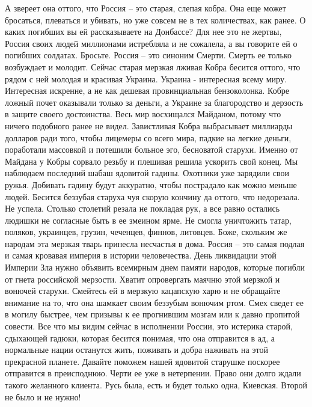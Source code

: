  
 
 
 
 

А звереет она оттого, что Россия – это старая, слепая кобра. Она еще может бросаться, плеваться и убивать, но уже совсем не в тех количествах, как ранее.
О каких погибших вы ей рассказываете на Донбассе? Для нее это не жертвы, Россия своих людей миллионами истребляла и не сожалела, а вы говорите ей о погибших солдатах. Бросьте. Россия – это синоним Смерти. Смерть ее только возбуждает и молодит.
Сейчас старая мерзкая лживая Кобра бесится оттого, что рядом с ней молодая и красивая Украина. Украина - интересная всему миру. Интересная искренне, а не как дешевая провинциальная бензоколонка. Кобре ложный почет оказывали только за деньги, а Украине за благородство и дерзость в защите своего достоинства. Весь мир восхищался Майданом, потому что ничего подобного ранее не видел. Завистливая Кобра выбрасывает миллиарды долларов ради того, чтобы лицемеры со всего мира, падкие на легкие деньги, поработали массовкой и потешили больное эго, бесноватой старухи.
Именно от Майдана у Кобры сорвало резьбу и плешивая решила ускорить свой конец. Мы наблюдаем последний шабаш ядовитой гадины. Охотники уже зарядили свои ружья. Добивать гадину будут аккуратно, чтобы пострадало как можно меньше людей.
Бесится беззубая старуха чуя скорую кончину да оттого, что недорезала. Не успела. Столько столетий резала не покладая рук, а все равно остались людишки не согласные быть в ее змеином ярме. Не смогла уничтожить татар, поляков, украинцев, грузин, чеченцев, финнов, литовцев. Боже, скольким же народам эта мерзкая тварь принесла несчастья в дома.
Россия – это самая подлая и самая кровавая империя в истории человечества. День ликвидации этой Империи Зла нужно объявить всемирным днем памяти народов, которые погибли от гнета российской мерзости.
Хватит опровергать маячню этой мерзкой и вонючей старухи. Смейтесь ей в мерзкую кацапскую харю и не обращайте внимание на то, что она шамкает своим беззубым вонючим ртом. Смех сведет ее в могилу быстрее, чем призывы к ее прогнившим мозгам или к давно пропитой совести.
Все что мы видим сейчас в исполнении России, это истерика старой, сдыхающей гадюки, которая бесится понимая, что она отправится в ад, а нормальные нации останутся жить, поживать и добра наживать на этой прекрасной планете.
Давайте поможем нашей ядовитой старушке поскорее отправится в преисподнюю. Черти ее уже в нетерпении. Право они долго ждали такого желанного клиента.
Русь была, есть и будет только одна, Киевская. Второй не было и не нужно!
